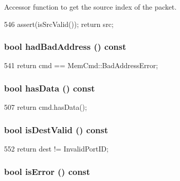 Accessor function to get the source index of the packet. 


\begin{DoxyCode}
546 { assert(isSrcValid()); return src; }
\end{DoxyCode}
\hypertarget{classPacket_a729b79fed5294aff99bb49b6b6d888bc}{
\subsubsection[{hadBadAddress}]{\setlength{\rightskip}{0pt plus 5cm}bool hadBadAddress () const}}
\label{classPacket_a729b79fed5294aff99bb49b6b6d888bc}



\begin{DoxyCode}
541 { return cmd == MemCmd::BadAddressError; }
\end{DoxyCode}
\hypertarget{classPacket_a0effbd4cf91891700ac41e86defe4aa6}{
\subsubsection[{hasData}]{\setlength{\rightskip}{0pt plus 5cm}bool hasData () const}}
\label{classPacket_a0effbd4cf91891700ac41e86defe4aa6}



\begin{DoxyCode}
507 { return cmd.hasData(); }
\end{DoxyCode}
\hypertarget{classPacket_a1a0afe1ec029c745df5d36293d306800}{
\subsubsection[{isDestValid}]{\setlength{\rightskip}{0pt plus 5cm}bool isDestValid () const}}
\label{classPacket_a1a0afe1ec029c745df5d36293d306800}



\begin{DoxyCode}
552 { return dest != InvalidPortID; }
\end{DoxyCode}
\hypertarget{classPacket_a32759931a1b2d6380407c6a18abd46e3}{
\subsubsection[{isError}]{\setlength{\rightskip}{0pt plus 5cm}bool isError () const}}
\label{classPacket_a32759931a1b2d6380407c6a18abd46e3}



